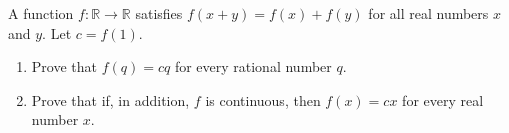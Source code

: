 A function $f:\mathbb R\to\mathbb R$ satisfies $f(x+y)=f(x)+f(y)$ for all real numbers $x$ and $y$. Let $c=f(1)$.
\begin{enumerate}
\item[(a)] Prove that $f(q)=cq$ for every rational number $q$.
\item[(b)] Prove that if, in addition, $f$ is continuous, then $f(x)=cx$ for every real number $x$.
\end{enumerate}
